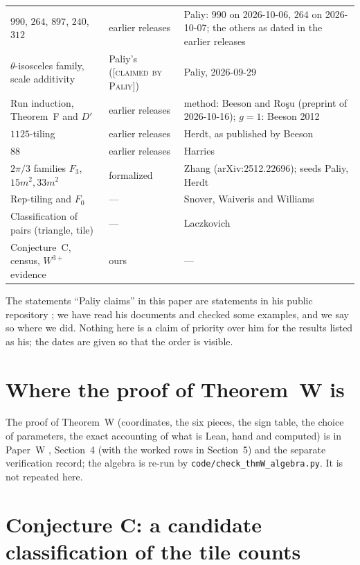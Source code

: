 \documentclass[11pt,reqno]{amsart}
\theoremstyle{plain}
\theoremstyle{definition}
\newcommand{\lab}[1]{\textup{[\textsc{#1}]}}
\newcommand{\CP}{\lab{claimed by Paliy}}
\begin{document}
\begin{center}
\begin{tabular}{@{}p{4.4cm}p{1.8cm}p{6.4cm}@{}}
$990$, $264$, $897$, $240$, $312$ & earlier releases & Paliy: $990$ on 2026-10-06, $264$ on 2026-10-07; the others as dated in the earlier releases\\
$\theta$-isosceles family, scale additivity & Paliy's (\CP{}) & Paliy, 2026-09-29\\
Run induction, Theorem~F and $D'$ & earlier releases & method: Beeson and Ro\c{s}u (preprint of 2026-10-16); $g=1$: Beeson 2012\\
$1125$-tiling & earlier releases & Herdt, as published by Beeson \cite{BeesonRosu}\\
$88$ & earlier releases & Harries\\
$2\pi/3$ families $F_3$, $15m^2,33m^2$ & formalized & Zhang (arXiv:2512.22696); seeds Paliy, Herdt\\
Rep-tiling and $F_0$ & --- & Snover, Waiveris and Williams\\
Classification of pairs (triangle, tile) & --- & Laczkovich\\
Conjecture~C, census, $W^{3+}$ evidence & ours & ---\\
\bottomrule
\end{tabular}
\end{center}
The statements ``Paliy claims'' in this paper are statements in his public repository \cite{PaliyRepo}; we have read his documents and checked some examples, and we say so where we did. Nothing here is a claim of priority over him for the results listed as his; the dates are given so that the order is visible.


\appendix
\section{Where the proof of Theorem~W is}\label{app:W}
The proof of Theorem~W (coordinates, the six pieces, the sign table, the choice of parameters, the exact accounting of what is Lean, hand and computed) is in Paper~W \cite{PaperW}, Section~4 (with the worked rows in Section~5) and the separate verification record; the algebra is re-run by \texttt{code/check\_thmW\_algebra.py}. It is not repeated here.

\section{Conjecture C: a candidate classification of the tile counts}\label{sec:conjC}
\end{document}
